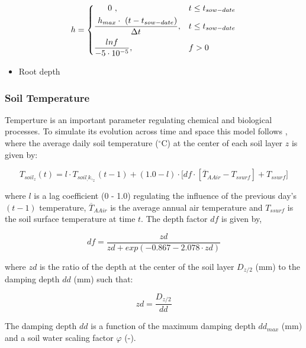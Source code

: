 \documentclass[]{article}
\providecommand{\tightlist}{%
  \setlength{\itemsep}{0pt}\setlength{\parskip}{0pt}}
\begin{document}
\begin{equation} 
    h = 
\begin{dcases}
     ~~~~~0~,                                     & t \leq t_{sow-date} \\
     \frac{~h_{max} \cdot~(t-t_{sow-date})}{\Delta t_{}} ,     & t \leq t_{sow-date} \\
    \frac{lnf}{-5\cdot10^{-5}},              & f > 0 
\end{dcases}
\end{equation}

\begin{itemize}
\tightlist
\item
  Root depth
\end{itemize}

\subsubsection{Soil Temperature}\label{soil-temperature}

Temperture is an important parameter regulating chemical and biological
processes. To simulate its evolution across time and space this model
follows \citep{Neitsch2009}, where the average daily soil temperature
(\(^{\circ}\)C) at the center of each soil layer \(z\) is given by:

\begin{equation}
T_{soil_z}(t) = l \cdot T_{soil_, k,_z}(t-1) + (1.0 - l) \cdot \big[df \cdot [\overline{T}_{AAir} - T_{ssurf}]+T_{ssurf}]
\label{eq:tempSoil} 
\end{equation}

where \(l\) is a lag coefficient (0 - 1.0) regulating the influence of
the previous day's \((t-1)\) temperature, \(\overline{T}_{AAir}\) is the
average annual air temperature and \(T_{ssurf}\) is the soil surface
temperature at time \(t\). The depth factor \(df\) is given by,

\begin{equation}
df = \frac{zd}{zd+exp(-0.867-2.078 \cdot zd)}
\label{eq:df} 
\end{equation}

where \(zd\) is the ratio of the depth at the center of the soil layer
\(D_{z/2}\) (mm) to the damping depth \(dd\) (mm) such that:

\begin{equation}
zd = \frac{D_{z/2}}{dd}
\label{eq:zd} 
\end{equation}

The damping depth \(dd\) is a function of the maximum damping depth
\(dd_{max}\) (mm) and a soil water scaling factor \(\varphi\) (-).
\end{document}
